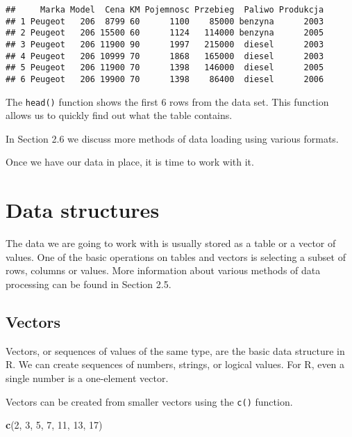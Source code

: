 \documentclass[]{book}
\newenvironment{Shaded}{\begin{snugshade}}{\end{snugshade}}
\newcommand{\KeywordTok}[1]{\textcolor[rgb]{0.13,0.29,0.53}{\textbf{#1}}}
\newcommand{\DecValTok}[1]{\textcolor[rgb]{0.00,0.00,0.81}{#1}}
\newcommand{\NormalTok}[1]{#1}
\theoremstyle{definition}
\theoremstyle{definition}
\theoremstyle{definition}
\theoremstyle{remark}
\begin{document}
\begin{verbatim}
##     Marka Model  Cena KM Pojemnosc Przebieg  Paliwo Produkcja
## 1 Peugeot   206  8799 60      1100    85000 benzyna      2003
## 2 Peugeot   206 15500 60      1124   114000 benzyna      2005
## 3 Peugeot   206 11900 90      1997   215000  diesel      2003
## 4 Peugeot   206 10999 70      1868   165000  diesel      2003
## 5 Peugeot   206 11900 70      1398   146000  diesel      2005
## 6 Peugeot   206 19900 70      1398    86400  diesel      2006
\end{verbatim}

The \texttt{head()} function shows the first 6 rows from the data set.
This function allows us to quickly find out what the table contains.

In Section 2.6 we discuss more methods of data loading using various
formats.

Once we have our data in place, it is time to work with it.

\section{Data structures}\label{part_22}

The data we are going to work with is usually stored as a table or a
vector of values. One of the basic operations on tables and vectors is
selecting a subset of rows, columns or values. More information about
various methods of data processing can be found in Section 2.5.

\subsection{Vectors}\label{part_221}

Vectors, or sequences of values of the same type, are the basic data
structure in R. We can create sequences of numbers, strings, or logical
values. For R, even a single number is a one-element vector.

Vectors can be created from smaller vectors using the \texttt{c()}
function.

\begin{Shaded}
\begin{Highlighting}[]
\KeywordTok{c}\NormalTok{(}\DecValTok{2}\NormalTok{, }\DecValTok{3}\NormalTok{, }\DecValTok{5}\NormalTok{, }\DecValTok{7}\NormalTok{, }\DecValTok{11}\NormalTok{, }\DecValTok{13}\NormalTok{, }\DecValTok{17}\NormalTok{)}
\end{Highlighting}
\end{Shaded}
\end{document}
